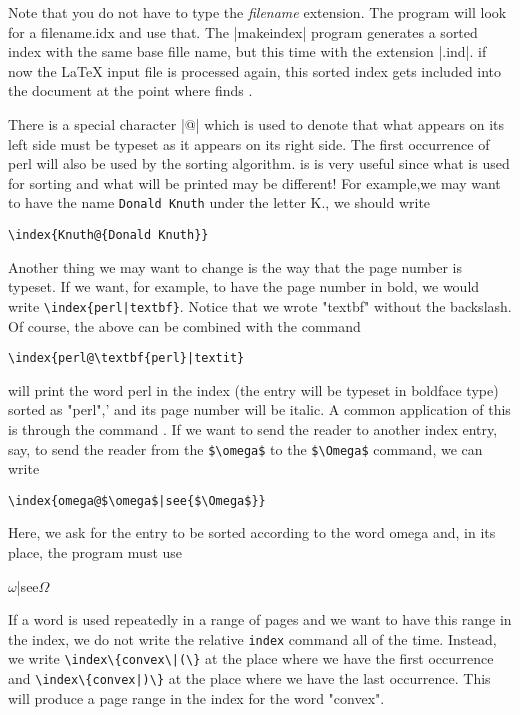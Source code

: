 \begin{multicols}{2}
Note that you do not have to type the \textit{filename} extension. The program will look for a filename.idx and use that.
The |makeindex| program generates a sorted index with the same base fille name, but this time with the extension |.ind|. if now
the LaTeX input file is processed again, this sorted index gets included into the document at the point where \latex
finds .

There is a  special character |@| which is used to denote that what appears on its left side must be
typeset as it appears on its right side.  The first occurrence of perl will also be used
by the sorting algorithm. is is very useful since what is used for sorting and what
will be printed may be different! For example,we may want to have the name 
\texttt{Donald Knuth}  under the letter K., we should write


\verb+\index{Knuth@{Donald Knuth}}+

Another thing we may want to change is the way that the page number is typeset.
If we want, for example, to have the page number in bold, we would write
\verb+\index{perl|textbf}+.  Notice that we wrote "textbf"  without the backslash. Of course,
the above can be combined with the  command


\verb+\index{perl@\textbf{perl}|textit}+


will print the word perl in the index (the entry will be typeset in boldface type) sorted
as "perl",’ and its page number will be italic. A common application of this is through
the command . If we want to send the reader to another index entry, say, to send
the reader from the \verb+$\omega$+ to the \verb+$\Omega$+ command, we can write

\verb+\index{omega@$\omega$|see{$\Omega$}}+


Here, we ask for the entry to be sorted according to the word omega and, in its place,
the program must use 

\begin{teX}
$\omega$|see{$\Omega$}
\end{teX}

If a word is used repeatedly in a range of pages and we want to have this range
in the index, we do not write the relative \texttt{index} command all of the time. Instead,
we write \verb+\index\{convex\|(\}+  at the place where we have the first occurrence and
\verb+\index\{convex|)\}+  at the place where we have the last occurrence. This will produce a
page range in the index for the word "convex".


\end{multicols}

